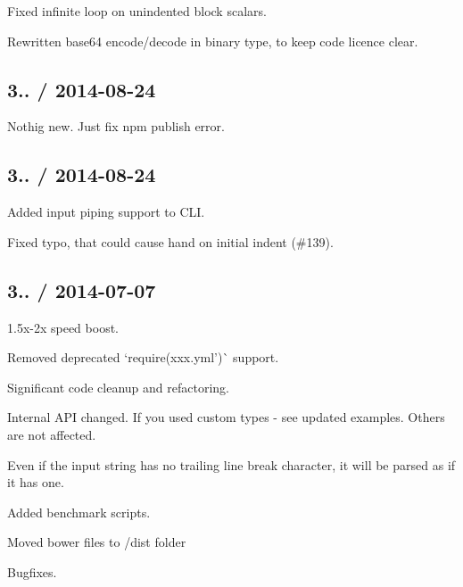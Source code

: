 \begin{DoxyItemize}
\item Fixed infinite loop on unindented block scalars.
\item Rewritten base64 encode/decode in binary type, to keep code licence clear.
\end{DoxyItemize}

\subsection*{3.. / 2014-\/08-\/24 }


\begin{DoxyItemize}
\item Nothig new. Just fix npm publish error.
\end{DoxyItemize}

\subsection*{3.. / 2014-\/08-\/24 }


\begin{DoxyItemize}
\item Added input piping support to C\+LI.
\item Fixed typo, that could cause hand on initial indent (\#139).
\end{DoxyItemize}

\subsection*{3.. / 2014-\/07-\/07 }


\begin{DoxyItemize}
\item 1.\+5x-\/2x speed boost.
\item Removed deprecated `require(\textquotesingle{}xxx.\+yml')\`{} support.
\item Significant code cleanup and refactoring.
\item Internal A\+PI changed. If you used custom types -\/ see updated examples. Others are not affected.
\item Even if the input string has no trailing line break character, it will be parsed as if it has one.
\item Added benchmark scripts.
\item Moved bower files to /dist folder
\item Bugfixes.
\end{DoxyItemize}

